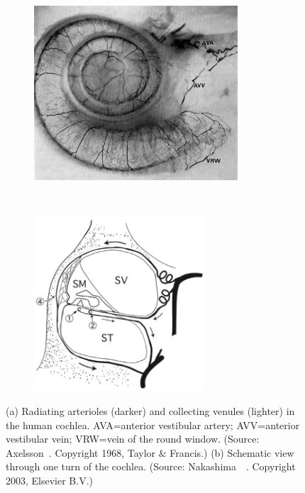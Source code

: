 \begin{figure}
	\centering
	
    \begin{subfigure}[t]{0.53\textwidth}
        \centering
        \includegraphics[height=6.5cm]{Background/radart}
        \caption{ }
        \label{fig:rad_art_top}
    \end{subfigure}
	~
	\begin{subfigure}[t]{0.45\textwidth}
        \centering
        \includegraphics[height=6.5cm]{Methodology/vesselsinturn}
        \caption{ }
        \label{fig:rad_art_section}
    \end{subfigure}
    
	\caption[Radiating arterioles and collecting venules]{(a) Radiating arterioles
	(darker) and collecting venules (lighter) in the human cochlea. AVA=anterior
	vestibular artery; AVV=anterior vestibular vein; VRW=vein of the round window.
	(Source: Axelsson~\cite{axelsson1968}. Copyright \textcopyright{} 1968, Taylor
	\& Francis.) (b) Schematic view through one turn of the cochlea. (Source:
	Nakashima~\etal~\cite{nakashima2003}. Copyright \textcopyright{} 2003, Elsevier
	B.V.)}
	\label{fig:rad_vessels}
\end{figure}

